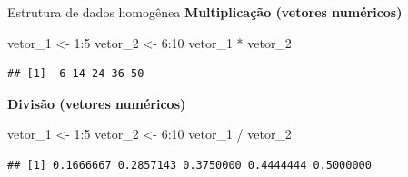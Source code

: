 \documentclass[
  10pt,
  ignorenonframetext,
]{beamer}
\newenvironment{Shaded}{}{}
\newcommand{\DecValTok}[1]{#1}
\newcommand{\NormalTok}[1]{#1}
\newcommand{\OperatorTok}[1]{#1}
\newcommand{\StringTok}[1]{\textcolor[rgb]{0.00,0.50,0.50}{#1}}
\begin{document}
\begin{frame}[fragile]{Estrutura de dados homogênea}
\protect\hypertarget{estrutura-de-dados-homoguxeanea-9}{}
\textbf{Multiplicação (vetores numéricos)}

\begin{Shaded}
\begin{Highlighting}[]
\NormalTok{vetor\_}\DecValTok{1}\NormalTok{ \textless{}{-}}\StringTok{ }\DecValTok{1}\OperatorTok{:}\DecValTok{5}
\NormalTok{vetor\_}\DecValTok{2}\NormalTok{ \textless{}{-}}\StringTok{ }\DecValTok{6}\OperatorTok{:}\DecValTok{10}
\NormalTok{vetor\_}\DecValTok{1} \OperatorTok{*}\StringTok{ }\NormalTok{vetor\_}\DecValTok{2}
\end{Highlighting}
\end{Shaded}

\begin{verbatim}
## [1]  6 14 24 36 50
\end{verbatim}

\textbf{Divisão (vetores numéricos)}

\begin{Shaded}
\begin{Highlighting}[]
\NormalTok{vetor\_}\DecValTok{1}\NormalTok{ \textless{}{-}}\StringTok{ }\DecValTok{1}\OperatorTok{:}\DecValTok{5}
\NormalTok{vetor\_}\DecValTok{2}\NormalTok{ \textless{}{-}}\StringTok{ }\DecValTok{6}\OperatorTok{:}\DecValTok{10}
\NormalTok{vetor\_}\DecValTok{1} \OperatorTok{/}\StringTok{ }\NormalTok{vetor\_}\DecValTok{2}
\end{Highlighting}
\end{Shaded}

\begin{verbatim}
## [1] 0.1666667 0.2857143 0.3750000 0.4444444 0.5000000
\end{verbatim}
\end{frame}
\end{document}
